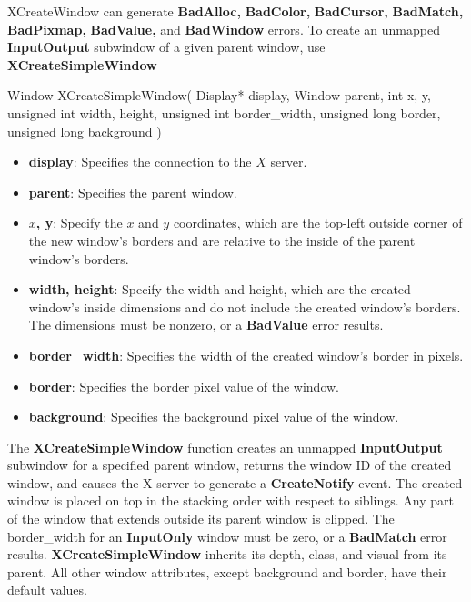 \documentclass{report}
\begin{document}
\begin{itemize}
            \bigbreak \noindent 
            XCreateWindow can generate \textbf{BadAlloc,} \textbf{BadColor,} \textbf{BadCursor,} \textbf{BadMatch,} \textbf{BadPixmap,} \textbf{BadValue,} and \textbf{BadWindow} errors.
            \bigbreak \noindent 
            To create an unmapped \textbf{InputOutput} subwindow of a given parent window, use \textbf{XCreateSimpleWindow}
            \bigbreak \noindent 
            \begin{cppcode}
                Window XCreateSimpleWindow(
                    Display* display,
                    Window parent, 
                    int x, y,
                    unsigned int width, height,
                    unsigned int border_width,
                    unsigned long border,
                    unsigned long background
                )
            \end{cppcode}
            \begin{itemize}
                \item \textbf{display}: Specifies the connection to the $X$ server.
                \item \textbf{parent}: Specifies the parent window.
                \item \textbf{$x$, y}: Specify the $x$ and $y$ coordinates, which are the top-left outside corner of the new window’s borders and are relative to the inside of the parent window’s borders.
                \item \textbf{width, height}: Specify the width and height, which are the created window’s inside dimensions and do not include the created window’s borders. The dimensions must be nonzero, or a \textbf{BadValue} error results.
                \item \textbf{border\_width}: Specifies the width of the created window’s border in pixels.
                \item \textbf{border}: Specifies the border pixel value of the window.
                \item \textbf{background}: Specifies the background pixel value of the window.
            \end{itemize}
            \bigbreak \noindent 
            The \textbf{XCreateSimpleWindow} function creates an unmapped \textbf{InputOutput} subwindow for a specified parent window, returns the window ID of the created window, and causes the X server to generate a \textbf{CreateNotify} event. The created window is placed on top in the stacking order with respect to siblings. Any part of the window that extends outside its parent window is clipped. The border\_width for an \textbf{InputOnly} window must be zero, or a \textbf{BadMatch} error results. \textbf{XCreateSimpleWindow} inherits its depth, class, and visual from its parent. All other window attributes, except background and border, have their default values.

\end{itemize}
\end{document}
